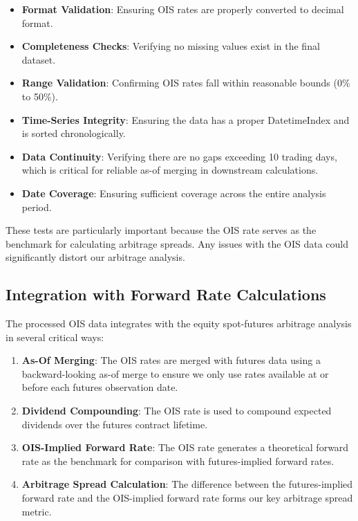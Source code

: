 \documentclass{article}
\begin{document}
\begin{itemize}
  \item \textbf{Format Validation}: Ensuring OIS rates are properly converted to decimal format.
  
  \item \textbf{Completeness Checks}: Verifying no missing values exist in the final dataset.
  
  \item \textbf{Range Validation}: Confirming OIS rates fall within reasonable bounds (0\% to 50\%).
  
  \item \textbf{Time-Series Integrity}: Ensuring the data has a proper DatetimeIndex and is sorted chronologically.
  
  \item \textbf{Data Continuity}: Verifying there are no gaps exceeding 10 trading days, which is critical for reliable as-of merging in downstream calculations.
  
  \item \textbf{Date Coverage}: Ensuring sufficient coverage across the entire analysis period.
\end{itemize}

These tests are particularly important because the OIS rate serves as the benchmark for calculating arbitrage spreads. Any issues with the OIS data could significantly distort our arbitrage analysis.

\subsection{Integration with Forward Rate Calculations}
The processed OIS data integrates with the equity spot-futures arbitrage analysis in several critical ways:

\begin{enumerate}
  \item \textbf{As-Of Merging}: The OIS rates are merged with futures data using a backward-looking as-of merge to ensure we only use rates available at or before each futures observation date.
  
  \item \textbf{Dividend Compounding}: The OIS rate is used to compound expected dividends over the futures contract lifetime.
  
  \item \textbf{OIS-Implied Forward Rate}: The OIS rate generates a theoretical forward rate as the benchmark for comparison with futures-implied forward rates.
  
  \item \textbf{Arbitrage Spread Calculation}: The difference between the futures-implied forward rate and the OIS-implied forward rate forms our key arbitrage spread metric.
\end{enumerate}
\end{document}
